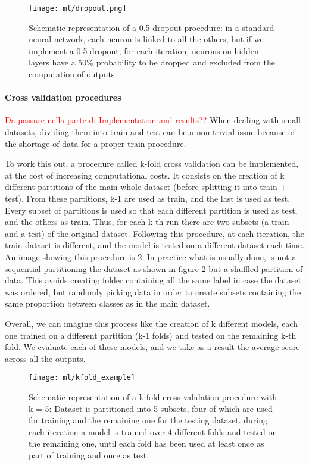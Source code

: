 \documentclass[11pt]{report}
\begin{document}
\begin{figure}
\centering
\texttt{[image: ml/dropout.png]}
\caption{Schematic representation of a 0.5 dropout procedure: in a standard neural network, each neuron is linked to all the others, but if we implement a 0.5 dropout, for each iteration, neurons on hidden layers have a 50\% probability to be dropped and excluded from the computation of outputs}
\label{fig:dropout}
\end{figure}

\paragraph{Cross validation procedures} \hfill
\textcolor{red}{Da passare nella parte di Implementation and results??}
\noindent When dealing with small datasets, dividing them into train and test can be a non trivial issue because of the shortage of data for a proper train procedure.

To work this out, a procedure called k-fold cross validation can be implemented, at the cost of increasing computational costs.
It consists on the creation of k different partitions of the main whole dataset (before splitting it into train + test).
From these partitions, k-1 are used as train, and the last is used as test.
Every subset of partitions is used so that each different partition is used as test, and the others as train.
Thus, for each k-th run there are two subsets (a train and a test) of the original dataset.
Following this procedure, at each iteration, the train dataset is different, and the model is tested on a different dataset each time.
An image showing this procedure is \ref{fig:kfold}.
In practice what is usually done, is not a sequential partitioning the dataset as shown in figure \ref{fig:kfold} but a shuffled partition of data.
This avoids creating folder containing all the same label in case the dataset was ordered, but randomly picking data in order to create subsets containing the same proportion between classes as in the main dataset.

Overall, we can imagine this process like the creation of k different models, each one trained on a different partition (k-1 folds) and tested on the remaining k-th fold.
We evaluate each of these models, and we take as a result the average score across all the outputs.


\begin{figure}
\centering
\texttt{[image: ml/kfold\_example]}
\caption{Schematic representation of a k-fold cross validation procedure with k = 5: Dataset is partitioned into 5 subsets, four of which are used for training and the remaining one for the testing dataset. during each iteration a model is trained over 4 different folds and tested on the remaining one, until each fold has been used at least once as part of training and once as test.
}
\label{fig:kfold}
\end{figure}
\end{document}
